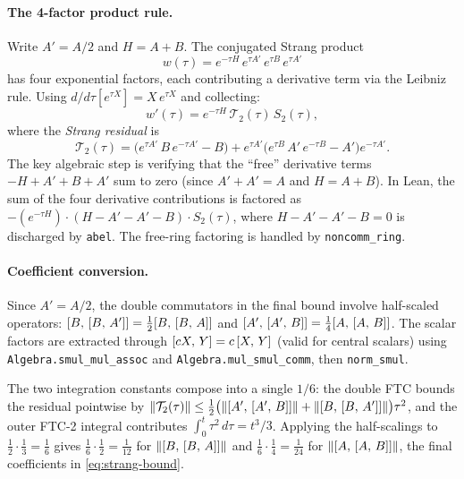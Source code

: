 \paragraph{The 4-factor product rule.}
Write $A' = A/2$ and $H = A + B$. The conjugated Strang product
\[
  w(\tau) = e^{-\tau H}\,e^{\tau A'}\,e^{\tau B}\,e^{\tau A'}
\]
has four exponential factors, each contributing a derivative term via the
Leibniz rule. Using $d/d\tau[e^{\tau X}] = X\,e^{\tau X}$ and collecting:
\begin{equation}\label{eq:4factor}
  w'(\tau) = e^{-\tau H}\,\mathcal{T}_2(\tau)\,S_2(\tau),
\end{equation}
where the \emph{Strang residual} is
\[
  \mathcal{T}_2(\tau)
    = \bigl(e^{\tau A'}\,B\,e^{-\tau A'} - B\bigr)
      + e^{\tau A'}\bigl(e^{\tau B}\,A'\,e^{-\tau B} - A'\bigr)e^{-\tau A'}.
\]
The key algebraic step is verifying that the ``free'' derivative terms
$-H + A' + B + A'$ sum to zero (since $A' + A' = A$ and $H = A + B$).
In Lean, the sum of the four derivative contributions is factored as
$-(e^{-\tau H}) \cdot (H - A' - A' - B) \cdot S_2(\tau)$, where
$H - A' - A' - B = 0$ is discharged by \texttt{abel}. The free-ring
factoring is handled by \texttt{noncomm\_ring}.

\paragraph{Coefficient conversion.}
Since $A' = A/2$, the double commutators in the final bound involve
half-scaled operators:
$[B,\,[B,\,A']] = \frac{1}{2}[B,\,[B,\,A]]$ and
$[A',\,[A',\,B]] = \frac{1}{4}[A,\,[A,\,B]]$.
The scalar factors are extracted through $[cX,\,Y] = c\,[X,\,Y]$
(valid for central scalars) using \texttt{Algebra.smul\_mul\_assoc} and
\texttt{Algebra.mul\_smul\_comm}, then \texttt{norm\_smul}.

The two integration constants compose into a single $1/6$: the double FTC
bounds the residual pointwise by
$\left\|\mathcal{T}_2(\tau)\right\| \le \tfrac{1}{2}\bigl(\left\|[A',\,[A',\,B]]\right\|
+ \left\|[B,\,[B,\,A']]\right\|\bigr)\tau^2$, and the outer FTC-2 integral
contributes $\int_0^t \tau^2\,d\tau = t^3/3$. Applying the half-scalings to
$\tfrac{1}{2}\cdot\tfrac{1}{3} = \tfrac{1}{6}$ gives
$\tfrac16 \cdot \tfrac12 = \tfrac{1}{12}$ for $\left\|[B,\,[B,\,A]]\right\|$
and $\tfrac16 \cdot \tfrac14 = \tfrac{1}{24}$ for $\left\|[A,\,[A,\,B]]\right\|$,
the final coefficients in \eqref{eq:strang-bound}.
